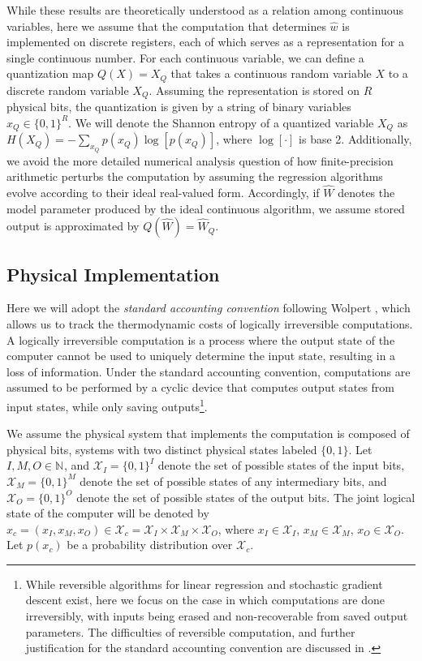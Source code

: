 \documentclass[12pt,onecolumn, margin=1in]{IEEEtran}
\newcommand{\N}[1]{\mathbb{N}^{#1}}
\newcommand{\Wh}{\hat{W}}
\begin{document}
While these results are theoretically understood as a relation among continuous variables, here we assume that the computation that determines $\hat w$ is implemented on discrete registers, each of which serves as a representation for a single continuous number. For each continuous variable, we can define a quantization map $Q(X) = X_Q$ that takes a continuous random variable $X$ to a discrete random variable $X_Q$. Assuming the representation is stored on $R$ physical bits, the quantization is given by a string of binary variables $x_Q \in \{0,1\}^R$. We will denote the Shannon entropy of a quantized variable $X_Q$ as $H(X_Q) = -\sum_{x_Q}p(x_Q) \log[p(x_Q)]$, where $\log[\cdot]$ is base 2. Additionally, we avoid the more detailed numerical analysis question of how finite-precision arithmetic perturbs the computation by assuming the regression algorithms evolve according to their ideal real-valued form. Accordingly, if $\Wh$ denotes the model parameter produced by the ideal continuous algorithm, we assume stored output is approximated by $Q(\Wh) = \Wh_Q$.



\subsection{Physical Implementation}\label{sec:phys_implement}

Here we will adopt the \textit{standard accounting convention} following Wolpert \cite[ pp. 32-36]{Wolpert2019}, which allows us to track the thermodynamic costs of logically irreversible computations. A logically irreversible computation is a process where the output state of the computer cannot be used to uniquely determine the input state, resulting in a loss of information. Under the standard accounting convention, computations are assumed to be performed by a cyclic device that computes output states from input states, while only saving outputs\footnote{While reversible algorithms for linear regression \cite{Demaine2021} and stochastic gradient descent \cite{maclaurin2015_rev_SGD} exist, here we focus on the case in which computations are done irreversibly, with inputs being erased and non-recoverable from saved output parameters. The difficulties of reversible computation, and further justification for the standard accounting convention are discussed in \cite{Wolpert2019}.}. 

We assume the physical system that implements the computation is composed of physical bits, systems with two distinct physical states labeled $\{0,1\}$. Let $I,M,O \in \N{}$, and $\mathcal{X}_I = \{0,1\}^I$ denote the set of possible states of the input bits, $\mathcal{X}_M = \{0,1\}^M$ denote the set of possible states of any intermediary bits, and $\mathcal{X}_O = \{0,1\}^O$ denote the set of possible states of the output bits. The joint logical state of the computer will be denoted by $x_c = (x_I, x_M, x_O)\in \mathcal{X}_c = \mathcal{X}_I \times \mathcal{X}_M \times \mathcal{X}_O$, where $x_I \in \mathcal{X}_I$, $x_M \in \mathcal{X}_M$, $x_O \in \mathcal{X}_O$. Let $p(x_c)$ be a probability distribution over $\mathcal{X}_c$. 
\end{document}
